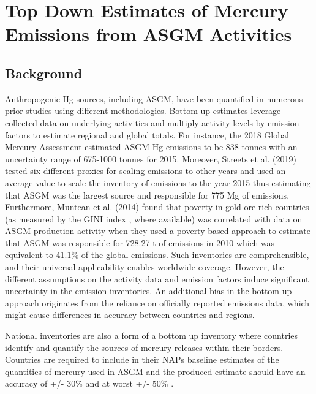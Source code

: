 \chapter{Top Down Estimates of Mercury Emissions from ASGM Activities}
\section{Background}
\begin{flushleft}
Anthropogenic Hg sources, including ASGM, have been quantified in numerous prior studies using different methodologies. Bottom-up estimates leverage collected data on underlying activities and multiply activity levels by emission factors to estimate regional and global totals. For instance, the 2018 Global Mercury Assessment estimated ASGM Hg emissions to be 838 tonnes with an uncertainty range of 675-1000 tonnes for 2015\cite{united_nations_environment_programme_technical_2019}. Moreover, Streets et al. (2019) tested six different proxies for scaling emissions to other years and used an average value to scale the inventory of emissions to the year 2015 thus estimating that ASGM was the largest source and responsible for 775 Mg of emissions\cite{streets_global_2019}. Furthermore, Muntean et al. (2014) found that poverty in  gold ore rich countries (as measured by the GINI index \cite{sadefo_kamdem_nice_2012}, where available) was correlated with data on ASGM production activity when they used a poverty-based approach to estimate that ASGM was responsible for 728.27 t of emissions in 2010 which was equivalent to 41.1\% of the global emissions\cite{muntean_evaluating_2018}. Such inventories are comprehensible, and their universal applicability enables worldwide coverage. However, the different assumptions on the activity data and emission factors induce significant uncertainty in the emission inventories. An additional bias in the bottom-up approach originates from the reliance on officially reported emissions data, which might cause differences in accuracy between countries and regions.

National inventories are also a form of a bottom up inventory where countries identify and quantify the sources of mercury releases within their borders. Countries are required to include in their NAPs baseline estimates of the quantities of mercury used in ASGM and the produced estimate should have an accuracy of +/- 30\% and at worst +/- 50\% \cite{united_nations_environment_programme_estimating_2017}.
\end{flushleft}
